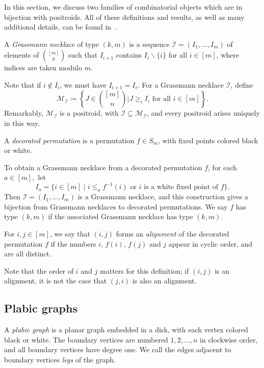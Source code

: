 \documentclass[ALCO,ThmDefs,Unicode,epreuves]{cedram}
\begin{document}
In this section, we discuss two families of combinatorial objects which are in bijection with positroids. All of these definitions and results, as well as many additional details, can be found in~\cite{Pos06}.

\begin{defi}
A \emph{Grassmann necklace} of type $(k,m)$ is a sequence
$\mathcal{I} = (I_1,\ldots,I_m)$ of elements of $\binom{[m]}{k}$ such that $I_{i+1}$ contains $I_i \backslash \{i\}$ for all $i \in [m]$, where indices are taken modulo $m$.
\end{defi}

Note that if $i \not\in I_{i}$, we must have $I_{i+1} = I_i$. 
For a Grassmann necklace $\mathcal{I}$, define
\[\mathcal{M}_{\mathcal{I}} \coloneqq \left\{%
J \in \binom{[m]}{n} \mathrel{\Bigg|} J \geq_i I_i \text{ for all }i \in [m]\right\}.\]
Remarkably, $\mathcal{M}_{\mathcal{I}}$ is a positroid, with $\mathcal{I} \subseteq \mathcal{M}_{\mathcal{I}}$, and every positroid arises uniquely in this way. 

\begin{defi}
A \emph{decorated permutation} is a permutation $f \in S_m$, with fixed points colored black or white. 
\end{defi}

To obtain a Grassmann necklace from a decorated permutation $f$, for each $a \in [m]$,~let
\[I_a = \{i \in [m] \mid i \leq_a f^{-1}(i) \text{ or $i$ is a white fixed point of $f$} \}.\]
Then $\mathcal{I} = (I_1,\ldots,I_m)$ is a Grassmann necklace, and this construction gives a bijection from Grassmann necklaces to decorated permutations. We say $f$ has type $(k,m)$ if the associated Grassmann necklace has type $(k,m)$.

\begin{defi} For $i,j \in [m]$, we say that $(i,j)$ forms an \emph{alignment} of the decorated permutation $f$ if the numbers $i$, $f(i)$, $f(j)$ and $j$ appear in cyclic order, and are all distinct.
\end{defi}

Note that the order of $i$ and $j$ matters for this definition; if $(i,j)$ is an alignment, it is not the case that $(j,i)$ is also an alignment.

\subsection{Plabic graphs}

A \emph{plabic graph} is a planar graph embedded in a disk, with each vertex colored black or white. The boundary vertices are numbered $1,2,\ldots,n$ in clockwise order, and all boundary vertices have degree one. We call the edges adjacent to boundary vertices \emph{legs} of the graph. 
\end{document}

